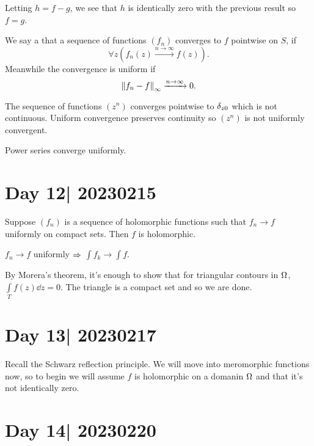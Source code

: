 \documentclass[12pt]{memoir}
\begin{document}
\begin{ptcbp}
    Letting $h=f-g$, we see that $h$ is identically zero with the previous result so $f=g$.
\end{ptcbp}

\begin{Def}
    We say a that a sequence of functions $(f_n)$ converges to $f$ pointwise on $S$, if 
    $$\forall z(f_n(z)\xrightarrow[]{n\to\infty} f(z)).$$
    Meanwhile the convergence is uniform if 
    $$\norm{f_n-f}_\infty\xrightarrow[]{n\to\infty}0.$$
\end{Def}

\begin{Ex}
    The sequence of functions $(z^n)$ converges pointwise to $\delta_{z0}$ which is not continuous. Uniform convergence preserves continuity so $(z^n)$ is not uniformly convergent.\par
    Power series converge uniformly.
\end{Ex}

\section{Day 12| 20230215}

\begin{Th}
    Suppose $(f_n)$ is a sequence of holomorphic functions such that $f_n\to f$ uniformly on compact sets. Then $f$ is holomorphic.
\end{Th}

\begin{Lem}
    $f_n\to f$ uniformly $\Rightarrow$ $\int f_k\to \int f$.
\end{Lem}

\begin{ptcbp}
    By Morera's theorem, it's enough to show that for triangular contours in $\Omega$, $\int\limits_Tf(z)\dd z=0$. The triangle is a compact set and so we are done.
\end{ptcbp}


\section{Day 13| 20230217}

Recall the Schwarz reflection principle. We will move into meromorphic functions now, so to begin we will assume $f$ is holomorphic on a domanin $\Omega$ and that it's not identically zero.

\section{Day 14| 20230220}
\end{document}

